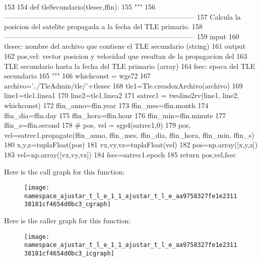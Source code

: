 \begin{DoxyCode}
153 
154 def tleSecundario(tlesec,ffin):
155     """
156    
       ---------------------------------------------------------------------------------
157     Calcula la posicion del satelite propagada a la fecha del TLE primario.
158    
       ---------------------------------------------------------------------------------
159     input
160         tlesec: nombre del archivo que contiene el TLE secundario (string)
161     output
162         pos,vel: vector posicion y velocidad que resultan de la propagacion del
163                 TLE secundario hasta la fecha del TLE primario (array)
164         fsec: epoca del TLE secundario
165     """
166     whichconst = wgs72
167     archivo='../TleAdmin/tle/'+tlesec
168     tle1=Tle.creadoxArchivo(archivo)
169     line1=tle1.linea1
170     line2=tle1.linea2
171     satrec1 = twoline2rv(line1, line2, whichconst)
172     ffin_anno=ffin.year
173     ffin_mes=ffin.month
174     ffin_dia=ffin.day
175     ffin_hora=ffin.hour
176     ffin_min=ffin.minute
177     ffin_s=ffin.second
178 #    pos, vel = sgp4(satrec1,0)
179     pos, vel=satrec1.propagate(ffin_anno, ffin_mes, ffin_dia, ffin_hora, 
      ffin_min, ffin_s)
180     x,y,z=tuplaFloat(pos)
181     vx,vy,vz=tuplaFloat(vel)
182     pos=np.array([x,y,z])
183     vel=np.array([vx,vy,vz])
184     fsec=satrec1.epoch
185     return pos,vel,fsec

\end{DoxyCode}


\-Here is the call graph for this function\-:\nopagebreak
\begin{figure}[H]
\begin{center}
\leavevmode
\texttt{[image: namespace\_ajustar\_t\_l\_e\_1\_1\_ajustar\_t\_l\_e\_aa9758327fe1e231138181cf4654d0bc3\_cgraph]}
\end{center}
\end{figure}




\-Here is the caller graph for this function\-:\nopagebreak
\begin{figure}[H]
\begin{center}
\leavevmode
\texttt{[image: namespace\_ajustar\_t\_l\_e\_1\_1\_ajustar\_t\_l\_e\_aa9758327fe1e231138181cf4654d0bc3\_icgraph]}
\end{center}
\end{figure}



